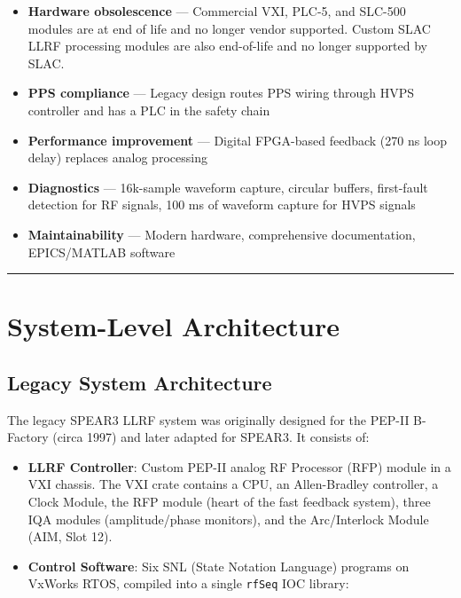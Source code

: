 {\begin{itemize}
\tightlist
\item
  \textbf{Hardware obsolescence} --- Commercial VXI, PLC-5, and SLC-500 modules are at end of life and no longer vendor supported. Custom SLAC LLRF processing modules are also end-of-life and no longer supported by SLAC.
\item
  \textbf{PPS compliance} --- Legacy design routes PPS wiring through HVPS controller and has a PLC in the safety chain
\item
  \textbf{Performance improvement} --- Digital FPGA-based feedback (270 ns loop delay) replaces analog processing
\item
  \textbf{Diagnostics} --- 16k-sample waveform capture, circular buffers, first-fault detection for RF signals, 100 ms of waveform capture for HVPS signals
\item
  \textbf{Maintainability} --- Modern hardware, comprehensive documentation, EPICS/MATLAB software
\end{itemize}

\begin{center}\rule{0.5\linewidth}{0.5pt}\end{center}

\section{System-Level Architecture}\label{system-level-architecture}

\subsection{Legacy System Architecture}\label{legacy-system-architecture}

The legacy SPEAR3 LLRF system was originally designed for the PEP-II B-Factory (circa 1997) and later adapted for SPEAR3. It consists of:

\begin{itemize}
\tightlist
\item
  \textbf{LLRF Controller}: Custom PEP-II analog RF Processor (RFP) module in a VXI chassis. The VXI crate contains a CPU, an Allen-Bradley controller, a Clock Module, the RFP module (heart of the fast feedback system), three IQA modules (amplitude/phase monitors), and the Arc/Interlock Module (AIM, Slot 12).
\item
  \textbf{Control Software}: Six SNL (State Notation Language) programs on VxWorks RTOS, compiled into a single \texttt{rfSeq} IOC library:


\end{itemize}}
